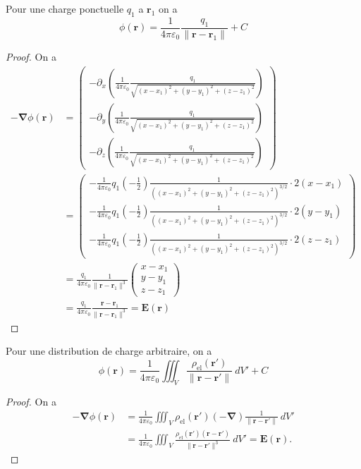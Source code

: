 Pour une charge ponctuelle $q_{1}$ a $\boldsymbol{r}_{1}$ on a 
$$
\phi(\boldsymbol{r})=\frac{1}{4\pi\varepsilon _{0}} \frac{q_{1}}{\lVert \boldsymbol{r}-\boldsymbol{r}_{1} \rVert }+C
$$
\begin{proof}
On a
\begin{align*}
-\boldsymbol{\nabla}\phi(\boldsymbol{r}) & =\begin{pmatrix}
-\partial _{x}\left( \frac{1}{4\pi\varepsilon_{0}} \frac{q_{1}}{\sqrt{ (x-x_{1})^{2}+(y-y_{1})^{2}+(z-z_{1})^{2} }} \right) \\
-\partial _{y}\left( \frac{1}{4\pi\varepsilon_{0}} \frac{q_{1}}{\sqrt{ (x-x_{1})^{2}+(y-y_{1})^{2}+(z-z_{1})^{2} }} \right) \\
-\partial _{z}\left( \frac{1}{4\pi\varepsilon_{0}} \frac{q_{1}}{\sqrt{ (x-x_{1})^{2}+(y-y_{1})^{2}+(z-z_{1})^{2} }} \right)
\end{pmatrix} \\
 & =\begin{pmatrix}
-\frac{1}{4\pi\varepsilon_{0}} q_{1}\left( -\frac{1}{2} \right) \frac{1}{((x-x_{1})^{2}+(y-y_{1})^{2}+(z-z_{1})^{2} )^{3/2}}\cdot2(x-x_{1}) \\
-\frac{1}{4\pi\varepsilon_{0}} q_{1}\left( -\frac{1}{2} \right) \frac{1}{((x-x_{1})^{2}+(y-y_{1})^{2}+(z-z_{1})^{2} )^{3/2}}\cdot 2(y-y_{1}) \\
-\frac{1}{4\pi\varepsilon_{0}} q_{1}\left( -\frac{1}{2} \right) \frac{1}{((x-x_{1})^{2}+(y-y_{1})^{2}+(z-z_{1})^{2} )^{3/2}}\cdot 2 (z-z_{1})
\end{pmatrix} \\
 & =\frac{q_{1}}{4\pi\varepsilon_{0}} \frac{1}{\lVert \boldsymbol{r}-\boldsymbol{r}_{1} \rVert ^{3}} \begin{pmatrix}
x-x_{1} \\
y-y_{1}  \\
z-z_{1}
\end{pmatrix}  \\
 & =\frac{q_{1}}{4\pi \varepsilon_{0}} \frac{\boldsymbol{r}-\boldsymbol{r}_{1}}{\lVert \boldsymbol{r}-\boldsymbol{r}_{1} \rVert^{3} }=\boldsymbol{E}(\boldsymbol{r})
\end{align*}
\end{proof}

Pour une distribution de charge arbitraire, on a
$$
\phi(\boldsymbol{r})=\frac{1}{4\pi\varepsilon_{0}}\iiint _{V} \frac{\rho _{\mathrm{el}}(\boldsymbol{r}')}{\lVert \boldsymbol{r}-\boldsymbol{r}' \rVert }~dV'+C
$$
\begin{proof}
On a 
\begin{align*}
-\boldsymbol{\nabla}\phi(\boldsymbol{r}) & =\frac{1}{4\pi\varepsilon_{0}}\iiint _{V}\rho _{\mathrm{el}} (\boldsymbol{r}')(-\boldsymbol{\nabla}) \frac{1}{\lVert \boldsymbol{r}-\boldsymbol{r}' \rVert  }~dV'  \\
 & =\frac{1}{4\pi \varepsilon_{0} }\iiint _{V} \frac{\rho _{\mathrm{el}}(\boldsymbol{r}')(\boldsymbol{r}-\boldsymbol{r}')}{\lVert \boldsymbol{r}-\boldsymbol{r}' \rVert ^{3}}~dV'=\boldsymbol{E}(\boldsymbol{r}).
\end{align*}
\end{proof}

